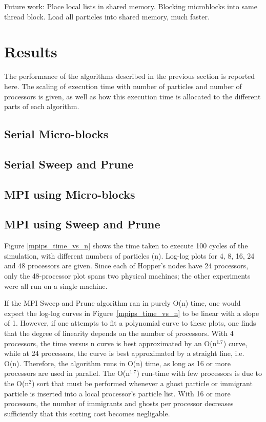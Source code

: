 \documentclass[11pt]{article} %
\begin{document}
Future work: Place local lists in shared memory. Blocking microblocks into same thread block. Load all particles into shared memory, much faster.

\section{Results}
\label{results-section}

The performance of the algorithms described in the previous section is reported here. The scaling of execution time with number of particles and number of processors is given, as well as how this execution time is allocated to the different parts of each algorithm.

\subsection{Serial Micro-blocks}

\subsection{Serial Sweep and Prune}

\subsection{MPI using Micro-blocks}

\subsection{MPI using Sweep and Prune}

Figure \ref{mpips_time_vs_n} shows the time taken to execute 100 cycles of the simulation, with different numbers of particles (n). Log-log plots for 4, 8, 16, 24 and 48 processors are given. Since each of Hopper's nodes have 24 processors, only the 48-processor plot spans two physical machines; the other experiments were all run on a single machine.

If the MPI Sweep and Prune algorithm ran in purely O(n) time, one would expect the log-log curves in Figure~\ref{mpips_time_vs_n} to be linear with a slope of 1. However, if one attempts to fit a polynomial curve to these plots, one finds that the degree of linearity depends on the number of processors. With 4 processors, the time versus n curve is best approximated by an O(n$^{1.7}$) curve, while at 24 processors, the curve is best approximated by a straight line, i.e. O(n). Therefore, the algorithm runs in O(n) time, as long as 16 or more processors are used in parallel. The O(n$^{1.7}$) run-time with few processors is due to the O(n$^{2}$) sort that must be performed whenever a ghost particle or immigrant particle is inserted into a local processor's particle list. With 16 or more processors, the number of immigrants and ghosts per processor decreases sufficiently that this sorting cost becomes negligable.
\end{document}
